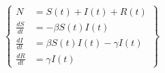 \documentclass[preview]{standalone}
\begin{document}
\begin{math}
\left \{
\begin{aligned}
    N &= S(t) + I(t) + R(t)\\
    \frac{dS}{dt} &= -\beta S(t)I(t)\\
    \frac{dI}{dt} &= \beta S(t)I(t) - \gamma I(t)\\
    \frac{dR}{dt} &= \gamma I(t)
\end{aligned}
\right \}
\end{math}
\end{document}
